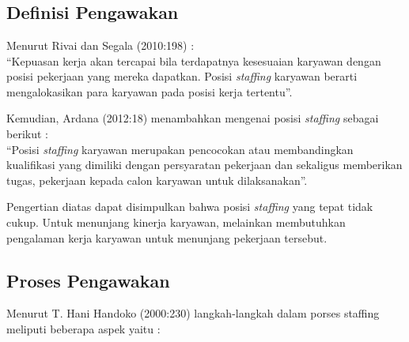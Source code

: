 \chapter{\babDua}


\section{Definisi Pengawakan}

Menurut Rivai dan Segala (2010:198) :
\\
“Kepuasan kerja akan tercapai bila terdapatnya kesesuaian karyawan dengan posisi pekerjaan yang mereka dapatkan. Posisi \textit{staffing} karyawan berarti mengalokasikan para karyawan pada posisi kerja tertentu”\cite{2}.

Kemudian, Ardana (2012:18) menambahkan mengenai posisi \textit{staffing} sebagai berikut : 
\\
“Posisi \textit{staffing} karyawan merupakan pencocokan atau membandingkan kualifikasi yang dimiliki dengan persyaratan pekerjaan dan sekaligus memberikan tugas, pekerjaan kepada calon karyawan untuk dilaksanakan”\cite{2}.

Pengertian diatas dapat disimpulkan bahwa posisi \textit{staffing}  yang tepat tidak cukup. Untuk menunjang kinerja karyawan, melainkan membutuhkan pengalaman kerja karyawan untuk menunjang pekerjaan tersebut.  




\section{Proses Pengawakan}

Menurut T. Hani Handoko (2000:230) langkah-langkah dalam porses staffing meliputi beberapa aspek yaitu \cite{3} : 

